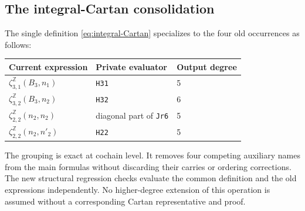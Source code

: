\subsection{The integral-Cartan consolidation}
The single definition \eqref{eq:integral-Cartan} specializes to the four old occurrences as follows:
\begin{center}
\begin{tabular}{lll}\toprule
Current expression & Private evaluator & Output degree\\\midrule
$\zeta^{\mathbb Z}_{3,1}(B_3,n_1)$ & \texttt{H31} & 5\\
$\zeta^{\mathbb Z}_{3,2}(B_3,n_2)$ & \texttt{H32} & 6\\
$\zeta^{\mathbb Z}_{2,2}(n_2,n_2)$ & diagonal part of \texttt{Jr6} & 5\\
$\zeta^{\mathbb Z}_{2,2}(n_2,n'_2)$ & \texttt{H22} & 5\\\bottomrule
\end{tabular}
\end{center}
The grouping is exact at cochain level. It removes four competing auxiliary names from the main formulas without discarding their carries or ordering corrections. The new structural regression checks evaluate the common definition and the old expressions independently. No higher-degree extension of this operation is assumed without a corresponding Cartan representative and proof.

